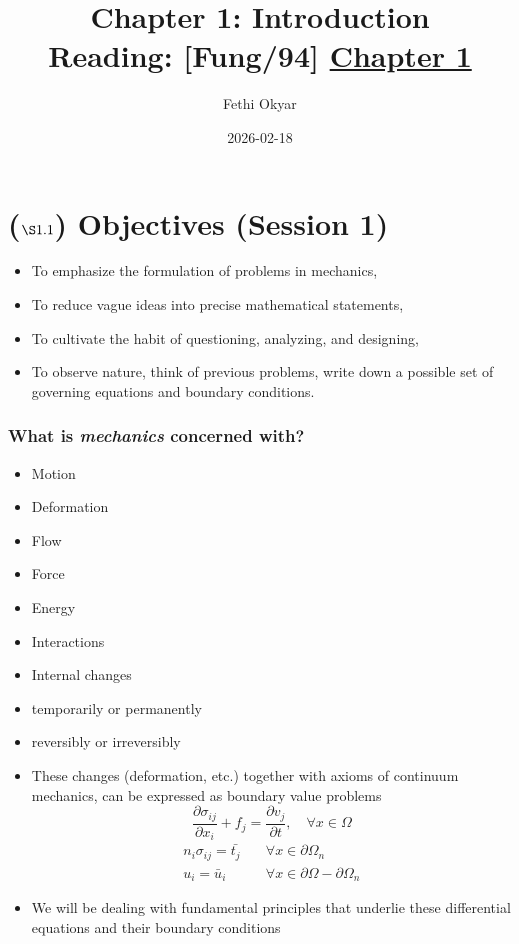 \documentclass[11pt]{article}
\author{Fethi Okyar}
\date{2026-02-18}
\title{Chapter 1: Introduction\\\medskip
\large Reading: [Fung/94] \href{../textbook\_excerpts/1\_TensorAlgebra.pdf}{Chapter 1}}
\begin{document}
\maketitle
\setcounter{tocdepth}{1}
\tableofcontents

\section*{(\(\S 1.1\)) Objectives (Session 1)}
\label{sec:org25212e7}
\begin{itemize}
\item To emphasize the formulation of problems in mechanics,
\item To reduce vague ideas into precise mathematical statements,
\item To cultivate the habit of questioning, analyzing, and designing,
\item To observe nature, think of previous problems, write down a possible set of governing equations and boundary conditions.
\end{itemize}
\subsubsection*{What is \emph{mechanics} concerned with?}
\label{sec:org9494286}
\begin{itemize}
\item Motion
\item Deformation
\item Flow
\item Force
\item Energy
\item Interactions
\item Internal changes
\item temporarily or permanently
\item reversibly or irreversibly
\end{itemize}

\begin{itemize}
\item These changes (deformation, etc.) together with axioms of continuum mechanics, can be expressed as boundary value problems
$$ \frac{\partial \sigma_{ij}}{\partial x_i} + f_j = \frac{\partial v_j}{\partial t}, \hspace{1em} \forall x \in \Omega $$
\begin{align}
 n_i \sigma_{ij} = \bar{t_j} \hspace{1em} & \forall x \in \partial\Omega_n \\
 u_i = \bar{u}_i \hspace{1em} & \forall x \in \partial\Omega - \partial\Omega_n
\end{align}

\item We will be dealing with fundamental principles that underlie these differential equations and their boundary conditions
\end{itemize}
\end{document}
